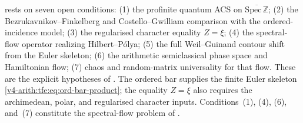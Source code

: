 \begin{remark}
\label{v4-arith:tfe:rem:residual}
 rests on seven open conditions:
(1) the profinite quantum ACS on \(\overline{\mathrm{Spec}\,\mathbb{Z}}\);
(2) the Bezrukavnikov--Finkelberg and Costello--Gwilliam comparison
    with the ordered-incidence model;
(3) the regularised character equality \(Z=\xi\);
(4) the spectral-flow operator realizing Hilbert--P\'{o}lya;
(5) the full Weil--Guinand contour shift from the Euler skeleton;
(6) the arithmetic semiclassical phase space and Hamiltonian flow;
(7) chaos and random-matrix universality for that flow.
These are the explicit hypotheses of .
The ordered bar supplies the finite Euler skeleton
\eqref{v4-arith:tfe:eq:ord-bar-product}; the equality \(Z=\xi\) also
requires the archimedean, polar, and regularised character inputs.
Conditions~(1), (4), (6),
and~(7) constitute the spectral-flow problem of
.
\end{remark}

